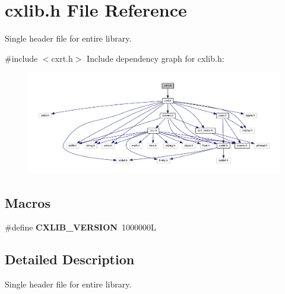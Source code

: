 \hypertarget{a00014}{}\section{cxlib.\+h File Reference}
\label{a00014}


Single header file for entire library.  


{\ttfamily \#include $<$cxrt.\+h$>$}\newline
Include dependency graph for cxlib.\+h\+:
\nopagebreak
\begin{figure}[H]
\begin{center}
\leavevmode
\includegraphics[width=350pt]{a00015}
\end{center}
\end{figure}
\subsection*{Macros}
\begin{DoxyCompactItemize}
\item 
\mbox{\label{a00014_a85ec71647670ef7260303289e48029fb}} 
\#define {\bfseries C\+X\+L\+I\+B\+\_\+\+V\+E\+R\+S\+I\+ON}~1000000L
\end{DoxyCompactItemize}


\subsection{Detailed Description}
Single header file for entire library. 

